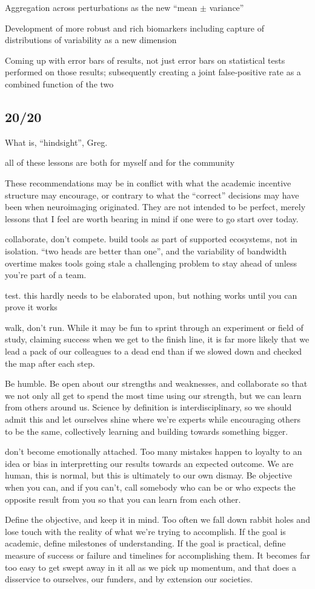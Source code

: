 Aggregation across perturbations as the new ``mean $\pm$ variance''

Development of more robust and rich biomarkers including capture of distributions of variability as a new dimension

Coming up with error bars of results, not just error bars on statistical tests performed on those results; subsequently
creating a joint false-positive rate as a combined function of the two

\subsection{20/20}
What is, ``hindsight'', Greg. 

all of these lessons are both for myself and for the community

These recommendations may be in conflict with what the academic incentive structure may encourage, or contrary to what
the ``correct'' decisions may have been when neuroimaging originated. They are not intended to be perfect, merely
lessons that I feel are worth bearing in mind if one were to go start over today.

collaborate, don't compete. build tools as part of supported ecosystems, not in isolation. ``two heads are better
than one'', and the variability of bandwidth overtime makes tools going stale a challenging problem to stay ahead of
unless you're part of a team.

test. this hardly needs to be elaborated upon, but nothing works until you can prove it works

walk, don't run. While it may be fun to sprint through an experiment or field of study, claiming success when we get to
the finish line, it is far more likely that we lead a pack of our colleagues to a dead end than if we slowed down and
checked the map after each step.

Be humble. Be open about our strengths and weaknesses, and collaborate so that we not only all get to spend the most
time using our strength, but we can learn from others around us. Science by definition is interdisciplinary, so we
should admit this and let ourselves shine where we're experts while encouraging others to be the same, collectively
learning and building towards something bigger.

don't become emotionally attached. Too many mistakes happen to loyalty to an idea or bias in interpretting our results
towards an expected outcome. We are human, this is normal, but this is ultimately to our own dismay. Be objective when
you can, and if you can't, call somebody who can be or who expects the opposite result from you so that you can learn
from each other.

Define the objective, and keep it in mind. Too often we fall down rabbit holes and lose touch with the reality of what
we're trying to accomplish. If the goal is academic, define milestones of understanding. If the goal is practical,
define measure of success or failure and timelines for accomplishing them. It becomes far too easy to get swept away in
it all as we pick up momentum, and that does a disservice to ourselves, our funders, and by extension our societies.

